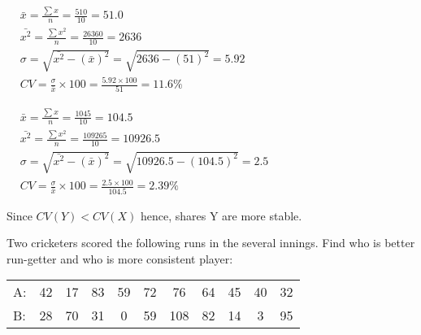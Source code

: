 \documentclass[12pt]{article}
\begin{document}
\vspace{1ex}
\begin{minipage}[t]{0.463\linewidth}
   \noindent
   \vspace{1ex}
   $\begin{aligned}
      &\bar{x} = \frac{\sum{x}}{n} = \frac{510}{10} = 51.0\\[1ex]
      &\bar{x^2} = \frac{\sum{x^2}}{n} = \frac{26360}{10} = 2636\\[1ex]
      &\sigma = \sqrt{\bar{x^2} - (\bar{x})^2} = \sqrt{2636 - (51)^2} = 5.92\\[1ex]
      &CV = \frac{\sigma}{\bar{x}}\times 100 = \frac{5.92 \times 100}{51} = 11.6\%
   \end{aligned}$

\end{minipage}\vrule\hspace{0.8ex}
\begin{minipage}[t]{0.52\linewidth}
   \noindent
   \vspace{1ex}
   $\begin{aligned}
      &\bar{x} = \frac{\sum{x}}{n} = \frac{1045}{10} = 104.5\\[1ex]
      &\bar{x^2} = \frac{\sum{x^2}}{n} = \frac{109265}{10} = 10926.5\\[1ex]
      &\sigma = \sqrt{\bar{x^2} - (\bar{x})^2} = \sqrt{10926.5 - (104.5)^2} = 2.5\\[1ex]
      &CV = \frac{\sigma}{\bar{x}}\times 100 = \frac{2.5 \times 100}{104.5} = 2.39\%
   \end{aligned}$
\end{minipage}

\vspace{2ex}
Since $CV(Y) < CV(X)$ hence, shares Y are more stable.

\pagebreak
\textbf{} Two cricketers scored the following runs in the several innings. Find who is better run-getter and
who is more consistent player:
\vspace{-0.25\baselineskip}
\begin{center}
   \begin{tabularx}{0.8\linewidth}{lC|C|C|C|C|C|C|C|C|C|}
      A: & 42 & 17 & 83 & 59 & 72 & 76 & 64 & 45 & 40 & 32\\
      B: & 28 & 70 & 31 & 0 & 59 & 108 & 82 & 14 & 3 & 95
   \end{tabularx}
\end{center}
\end{document}
